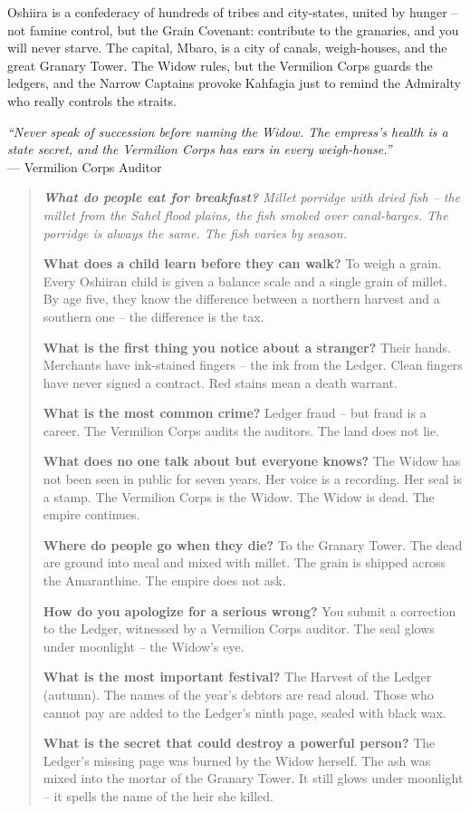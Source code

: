 \documentclass[12pt,oneside]{book}
\newenvironment{almanac}
  {\begin{quote}\small\itshape}
  {\end{quote}}
\begin{document}
\noindent
Oshiira is a confederacy of hundreds of tribes and city-states, united by hunger -- not famine control, but the Grain Covenant: contribute to the granaries, and you will never starve. The capital, Mbaro, is a city of canals, weigh-houses, and the great Granary Tower. The Widow rules, but the Vermilion Corps guards the ledgers, and the Narrow Captains provoke Kahfagia just to remind the Admiralty who really controls the straits.

\vspace{0.5em}
\noindent\textit{``Never speak of succession before naming the Widow. The empress's health is a state secret, and the Vermilion Corps has ears in every weigh-house.''} \\
--- Vermilion Corps Auditor

\vspace{1em}
\begin{almanac}
\textbf{What do people eat for breakfast?} Millet porridge with dried fish -- the millet from the Sahel flood plains, the fish smoked over canal-barges. The porridge is always the same. The fish varies by season.

\textbf{What does a child learn before they can walk?} To weigh a grain. Every Oshiiran child is given a balance scale and a single grain of millet. By age five, they know the difference between a northern harvest and a southern one -- the difference is the tax.

\textbf{What is the first thing you notice about a stranger?} Their hands. Merchants have ink-stained fingers -- the ink from the Ledger. Clean fingers have never signed a contract. Red stains mean a death warrant.

\textbf{What is the most common crime?} Ledger fraud -- but fraud is a career. The Vermilion Corps audits the auditors. The land does not lie.

\textbf{What does no one talk about but everyone knows?} The Widow has not been seen in public for seven years. Her voice is a recording. Her seal is a stamp. The Vermilion Corps is the Widow. The Widow is dead. The empire continues.

\textbf{Where do people go when they die?} To the Granary Tower. The dead are ground into meal and mixed with millet. The grain is shipped across the Amaranthine. The empire does not ask.

\textbf{How do you apologize for a serious wrong?} You submit a correction to the Ledger, witnessed by a Vermilion Corps auditor. The seal glows under moonlight -- the Widow's eye.

\textbf{What is the most important festival?} The Harvest of the Ledger (autumn). The names of the year's debtors are read aloud. Those who cannot pay are added to the Ledger's ninth page, sealed with black wax.

\textbf{What is the secret that could destroy a powerful person?} The Ledger's missing page was burned by the Widow herself. The ash was mixed into the mortar of the Granary Tower. It still glows under moonlight -- it spells the name of the heir she killed.
\end{almanac}
\end{document}
